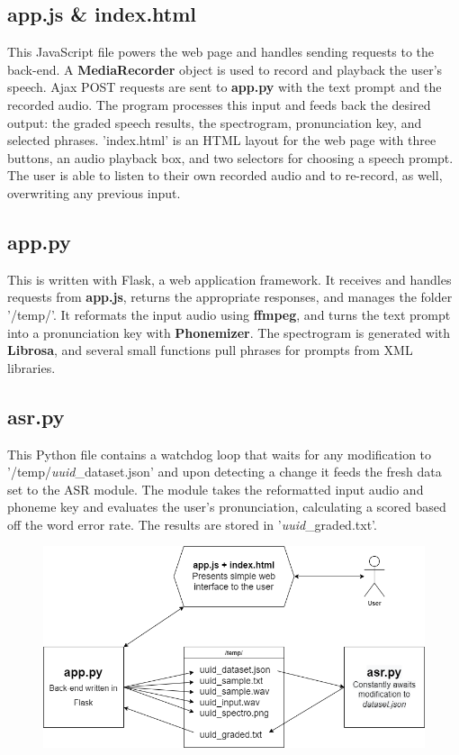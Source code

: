 \documentclass[12pt, letterpaper]{article}
\begin{document}
\subsection*{app.js & index.html}
This JavaScript file powers the web page and handles sending requests to the back-end. A \textbf{MediaRecorder} object is used to record and playback the user's speech. Ajax POST requests are sent to \textbf{app.py} with the text prompt and the recorded audio. The program processes this input and feeds back the desired output: the graded speech results, the spectrogram, pronunciation key, and selected phrases. 'index.html' is an HTML layout for the web page with three buttons, an audio playback box, and two selectors for choosing a speech prompt. The user is able to listen to their own recorded audio and to re-record, as well, overwriting any previous input.

\subsection*{app.py}
This is written with Flask, a web application framework. It receives and handles requests from \textbf{app.js}, returns the appropriate responses, and manages the folder '/temp/'. It reformats the input audio using \textbf{ffmpeg}, and turns the text prompt into a pronunciation key with \textbf{Phonemizer}. The spectrogram is generated with \textbf{Librosa}, and several small functions pull phrases for prompts from XML libraries. 

\subsection*{asr.py}
This Python file contains a watchdog loop that waits for any modification to '/temp/\textit{uuid}\_dataset.json' and upon detecting a change it feeds the fresh data set to the ASR module. The module takes the reformatted input audio and phoneme key and evaluates the user's pronunciation, calculating a scored based off the word error rate. The results are stored in '\textit{uuid}\_graded.txt'.

\begin{figure}[h!]
  \includegraphics[scale=0.6]{images/workflow.png}
\end{figure}
\end{document}

